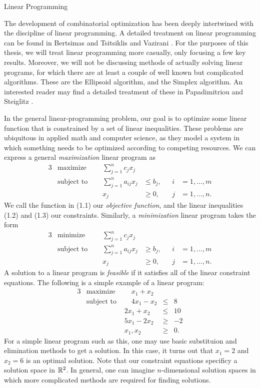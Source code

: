 \begin{section}{Linear Programming}

	The development of combinatorial optimization has been deeply intertwined with the discipline 
	of linear programming. 
	A detailed treatment on linear programming can be found in Bertsimas and Tsitsiklis 
	\cite{bertsimas1997introduction} and Vazirani \cite{vazirani2002approximation}.
	For the purposes of this thesis, we will treat linear programming more casually, only focusing 
	a few key results. Moreover, we will not be discussing methods of actually solving linear 
	programs, for which there are at least a couple of well known but complicated algorithms. These 
	are the Ellipsoid algorithm, and the Simplex algorithm. An interested reader may find a detailed 
	treatment of these in Papadimitriou and Steiglitz \cite{papadimitriou2013combinatorial}.

	In the general linear-programming problem, our goal is to optimize some linear function that 
	is constrained by a set of linear inequalities. These problems are ubiquitous in applied math 
	and computer science, as they model a system in which something needs to be optimized according 
	to competing resources. We can express a general \emph{maximization} linear program as
	\begin{alignat}{3}
		& \text{maximize } & \sum_{j=1}^{n} c_{j} x_{j}& \\
		& \text{subject to } \quad & \sum_{j=1}^{n} a_{ij} x_{j} & \leq b_{j}, & i & = 1, \dots 
		, m \\
				&& x_{j} & \geq 0, \quad & j & = 1, \dots, n.
	\end{alignat}
	We call the function in (1.1) our \emph{objective function}, and the linear inequalities (1.2) 
	and (1.3) our constraints. Similarly, a \emph{minimization} linear program takes the form
	\begin{alignat}{3}
		& \text{minimize } & \sum_{j=1}^{n} c_{j} x_{j}& \\
		& \text{subject to } \quad & \sum_{j=1}^{n} a_{ij} x_{j} & \geq b_{j}, & i & = 1, \dots 
		, m \\
				&& x_{j} & \geq 0, \quad & j & = 1, \dots, n.
	\end{alignat}
	A solution to a linear program is \emph{feasible} if it satisfies all of the linear 
	constraint equations. The following is a simple example of a linear program:
	\begin{alignat*}{3}
		& \text{maximize } &\quad x_1 + x_2 & \\
		& \text{subject to } &\quad 4x_1 - x_2 &\leq &8 \\
				     && 2x_1 + x_2 &\leq &10 \\
				     && 5x_1 - 2x_2 &\geq &-2 \\
				     && x_1,x_2 & \geq &0.
	\end{alignat*}
	For a simple linear program such as this, one may use basic substituion and elimination methods 
	to get a solution. In this case, it turns out that $x_1 = 2$ and $x_2 = 6$ is an optimal 
	solution. Note that our 
	constraint equations specificy a solution space in $\mathbb{R}^2$. In general, one can imagine 
	$n$-dimensional solution spaces in which more complicated methods are required for 
	finding solutions.


\end{section}
